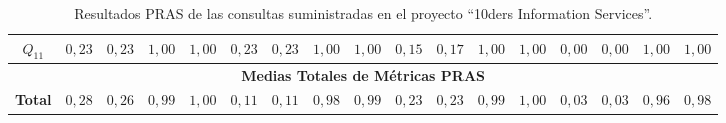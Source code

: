 \begin{sidewaystable}[!htb]
\begin{center}
\begin{tabular}{|c||c|c|c|c||c|c|c|c||c|c|c|c||c|c|c|c|}
$Q_{11}$  &$0,23$ & $0,23$ & $1,00$ & $1,00$ & 		$0,23$ & $0,23$ & $1,00$ & $1,00$ & 	$0,15$ & $0,17$ & $1,00$ & $1,00$ & 	$0,00$ & $0,00$ & $1,00$ & $1,00$ \\ \hline
\multicolumn{17}{|c|}{\textbf{Medias Totales de Métricas PRAS}} \\ \hline
\textbf{Total}  &$0,28$ & $0,26$ & $0,99$ & $1,00$ & 	$0,11$ & $0,11$ & $0,98$ & $0,99$ & 	$0,23$ & $0,23$ & $0,99$ & $1,00$ & 	$0,03$ & $0,03$ & $0,96$ & $0,98$ \\ \hline
\hline
 \end{tabular}
\caption{Resultados PRAS de las consultas suministradas en el proyecto ``10ders Information Services''.}\label{table:queries-ir-results}
  \label{tabla:results-dss}
  \end{center}
\end{sidewaystable} 

